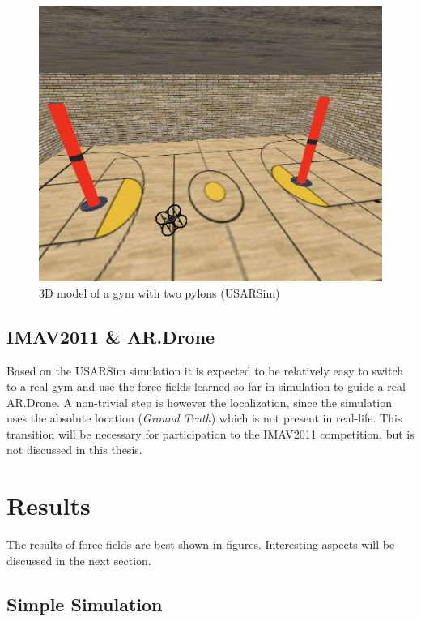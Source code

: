 \documentclass[11pt]{article}
\begin{document}
  \begin{figure}
    \includegraphics[width=1.0\textwidth]{img/gym}
    \caption{3D model of a gym with two pylons (USARSim)}
    \label{fig:gym}
  \end{figure}


\subsection{IMAV2011 \& AR.Drone}
Based on the USARSim simulation it is expected to be relatively easy to switch to a real gym and use the force fields learned so far in simulation to guide a real AR.Drone. A non-trivial step is however the localization, since the simulation uses the absolute location (\emph{Ground Truth}) which is not present in real-life. This transition will be necessary for participation to the IMAV2011 competition, but is not discussed in this thesis.



\section{Results}
\label{sec:results}

The results of force fields are best shown in figures. Interesting aspects will be discussed in the next section.


\subsection{Simple Simulation}
\end{document}

